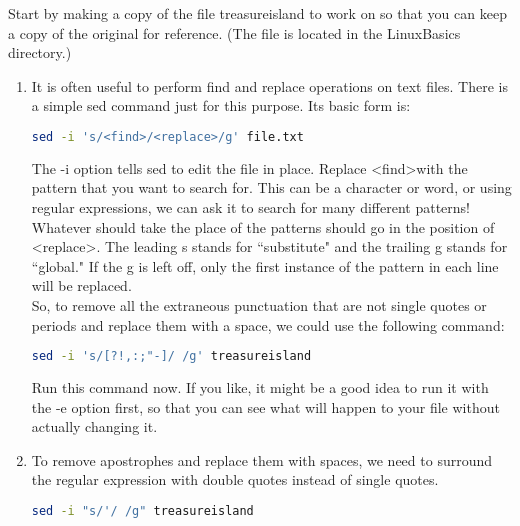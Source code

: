 \documentclass[11pt,a4paper]{article}
\begin{document}
Start by making a copy of the file treasureisland to work on so that you can keep a copy of the original for reference. (The file is located in the LinuxBasics directory.)

\begin{enumerate}
\item It is often useful to perform find and replace operations on text files. There is a simple sed command just for this purpose. Its basic form is:

\begin{lstlisting}[basicstyle=\ttfamily, backgroundcolor = \color{lightgray}, language = bash, xleftmargin = 0cm, framexleftmargin = 1em]
sed -i 's/<find>/<replace>/g' file.txt
\end{lstlisting}

The -i option tells sed to edit the file in place. Replace \textless find\textgreater with the pattern that you want to search for. This can be a character or word, or using regular expressions, we can ask it to search for many different patterns! Whatever should take the place of the patterns should go in the position of \textless replace\textgreater. The leading s stands for ``substitute" and the trailing g stands for ``global." If the g is left off, only the first instance of the pattern in each line will be replaced.\\

So, to remove all the extraneous punctuation that are not single quotes or periods and replace them with a space, we could use the following command:

\begin{lstlisting}[basicstyle=\ttfamily, backgroundcolor = \color{lightgray}, language = bash, xleftmargin = 0cm, framexleftmargin = 1em]
sed -i 's/[?!,:;"-]/ /g' treasureisland
\end{lstlisting}

Run this command now. If you like, it might be a good idea to run it with the -e option first, so that you can see what will happen to your file without actually changing it.

\item To remove apostrophes and replace them with spaces, we need to surround the regular expression with double quotes instead of single quotes.

\begin{lstlisting}[basicstyle=\ttfamily, backgroundcolor = \color{lightgray}, language = bash, xleftmargin = 0cm, framexleftmargin = 1em]
sed -i "s/'/ /g" treasureisland
\end{lstlisting}


\end{enumerate}
\end{document}

